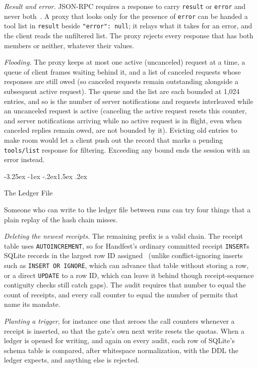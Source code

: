 \documentclass[10pt,twocolumn]{article}
\makeatletter
\theoremstyle{plain}
\theoremstyle{definition}
\renewcommand\subsection{\@startsection{subsection}{2}{\z@}%
  {-3.25ex \@plus -1ex \@minus -.2ex}{1.5ex \@plus .2ex}%
  {\normalfont\large\bfseries\raggedright}}
\makeatother
\begin{document}
\emph{Result and error.} JSON-RPC requires a response to carry \texttt{result} or \texttt{error} and never both~\cite{jsonrpc2}. A proxy that looks only for the presence of \texttt{error} can be handed a tool list in \texttt{result} beside \texttt{"error": null}; it relays what it takes for an error, and the client reads the unfiltered list. The proxy rejects every response that has both members or neither, whatever their values.

\emph{Flooding.} The proxy keeps at most one active (uncanceled) request at a time, a queue of client frames waiting behind it, and a list of canceled requests whose responses are still owed (so canceled requests remain outstanding alongside a subsequent active request). The queue and the list are each bounded at 1{,}024 entries, and so is the number of server notifications and requests interleaved while an uncanceled request is active (canceling the active request resets this counter, and server notifications arriving while no active request is in flight, even when canceled replies remain owed, are not bounded by it). Evicting old entries to make room would let a client push out the record that marks a pending \texttt{tools/list} response for filtering. Exceeding any bound ends the session with an error instead.

\subsection{The Ledger File}
\label{sec:attack-ledger}

Someone who can write to the ledger file between runs can try four things that a plain replay of the hash chain misses.

\emph{Deleting the newest receipts.} The remaining prefix is a valid chain. The receipt table uses \texttt{AUTOINCREMENT}, so for Handfest's ordinary committed receipt \texttt{INSERT}s SQLite records in  the largest row ID assigned~\cite{sqlite_autoinc} (unlike conflict-ignoring inserts such as \texttt{INSERT OR IGNORE}, which can advance that table without storing a row, or a direct \texttt{UPDATE} to a row ID, which can leave it behind though receipt-sequence contiguity checks still catch gaps). The audit requires that number to equal the count of receipts, and every call counter to equal the number of permits that name its mandate.

\emph{Planting a trigger}, for instance one that zeroes the call counters whenever a receipt is inserted, so that the gate's own next write resets the quotas. When a ledger is opened for writing, and again on every audit, each row of SQLite's schema table is compared, after whitespace normalization, with the DDL the ledger expects, and anything else is rejected.
\end{document}
